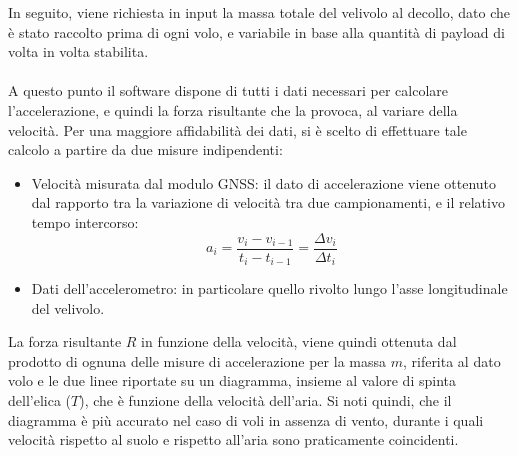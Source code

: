 \documentclass[12pt]{article}
\begin{document}
\noindent
In seguito, viene richiesta in input la massa totale del velivolo al decollo, dato che è stato raccolto prima di ogni volo, e variabile in base alla quantità di payload di volta in volta stabilita.
\\\\
A questo punto il software dispone di tutti i dati necessari per calcolare l'accelerazione, e quindi la forza risultante che la provoca, al variare della velocità. Per una maggiore affidabilità dei dati, si è scelto di effettuare tale calcolo a partire da due misure indipendenti:
\begin{itemize}
\item Velocità misurata dal modulo GNSS: il dato di accelerazione viene ottenuto dal rapporto tra la variazione di velocità tra due campionamenti, e il relativo tempo intercorso: 
\begin{equation}
a_i = \frac{v_i - v_{i-1}}{t_i - t_{i-1}} = \frac{\Delta v_i}{\Delta t_i}
\end{equation}

\item Dati dell'accelerometro: in particolare quello rivolto lungo l'asse longitudinale del velivolo. 
\end{itemize}

\noindent
La forza risultante $R$ in funzione della velocità, viene quindi ottenuta dal prodotto di ognuna delle misure di accelerazione per la massa $m$, riferita al dato volo e le due linee riportate su un diagramma, insieme al valore di spinta dell'elica ($T$), che è funzione della velocità dell'aria. Si noti quindi, che il diagramma è più accurato nel caso di voli in assenza di vento, durante i quali velocità rispetto al suolo e rispetto all'aria sono praticamente coincidenti.
\end{document}
